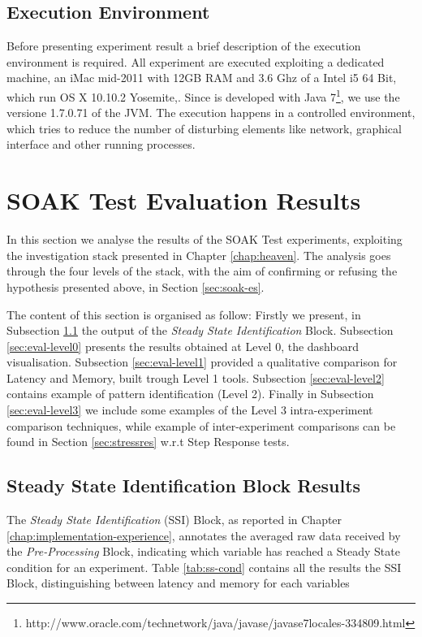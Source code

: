 \subsection{Execution Environment}\label{sec:execution-environment}

Before presenting experiment result a brief description of the execution environment is required. All experiment are executed exploiting a dedicated machine, an iMac mid-2011 with 12GB RAM and 3.6 Ghz of a Intel i5 64 Bit, which run OS X 10.10.2 Yosemite,. Since \name is developed with Java 7\footnote{http://www.oracle.com/technetwork/java/javase/javase7locales-334809.html}, we use the versione 1.7.0.71 of the JVM.
The execution happens in a controlled environment, which tries to reduce the number of disturbing elements like network, graphical interface and other running processes.

\section{SOAK Test Evaluation Results}\label{sec:soakres}

In this section we analyse the results of the SOAK Test experiments, exploiting the investigation stack presented in Chapter \ref{chap:heaven}. The analysis goes through the four levels of the stack, with the aim of confirming or refusing the hypothesis presented above, in Section \ref{sec:soak-es}. 

The content of this section is organised as follow: Firstly we present, in Subsection \ref{sec:eval-ssib} the output of the \textit{Steady State Identification} Block. Subsection \ref{sec:eval-level0} presents the results obtained at Level 0, the dashboard visualisation.  Subsection \ref{sec:eval-level1} provided a qualitative comparison for Latency and Memory, built trough Level 1 tools. Subsection \ref{sec:eval-level2} contains example of pattern identification (Level 2). Finally in Subsection \ref{sec:eval-level3} we include some examples of the Level 3 intra-experiment comparison techniques, while example of inter-experiment comparisons can be found in Section \ref{sec:stressres} w.r.t Step Response tests.


\subsection{Steady State Identification Block Results}\label{sec:eval-ssib}

The \textit{Steady State Identification} (SSI) Block, as reported in Chapter \ref{chap:implementation-experience}, annotates the averaged raw data received by the \textit{Pre-Processing} Block, indicating which variable has reached a Steady State condition for an experiment. Table \ref{tab:ss-cond} contains all the results the SSI Block, distinguishing between latency and memory for each variables

